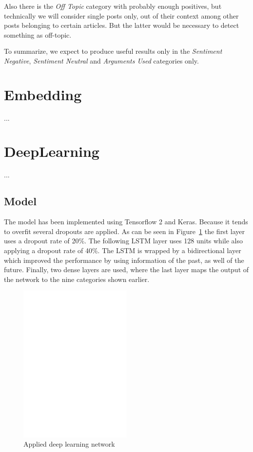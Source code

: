 \documentclass[11pt,a4paper]{article}
\begin{document}
Also there is the \textit{Off Topic} category with probably enough positives, but technically we will consider single posts only, out of their context among other posts belonging to certain articles. But the latter would be necessary to detect something as off-topic.

To summarize, we expect to produce useful results only in the \textit{Sentiment Negative}, \textit{Sentiment Neutral} and \textit{Arguments Used} categories only.

\section{Embedding}

...  ~\cite{word2vec} ~\cite{gensim} ~\cite{depset.ai}


\section{DeepLearning}

...


\subsection{Model}
The model has been implemented using Tensorflow 2 and Keras. Because it tends to overfit several dropouts are applied. As can be seen in Figure~\ref{fig:model} the first layer uses a dropout rate of 20\%. The following LSTM layer uses 128 units while also applying a dropout rate of 40\%. The LSTM is wrapped by a bidirectional layer which improved the performance by using information of the past, as well of the future. Finally, two dense layers are used, where the last layer maps the output of the network to the nine categories shown earlier.

\begin{figure}[h!]
	\centering
	\includegraphics[trim={1cm 19.5cm 5cm 3cm},clip,page=2, width=0.5\textwidth]{img/model}
	\caption{Applied deep learning network}
	\label{fig:model}
\end{figure}
\end{document}
